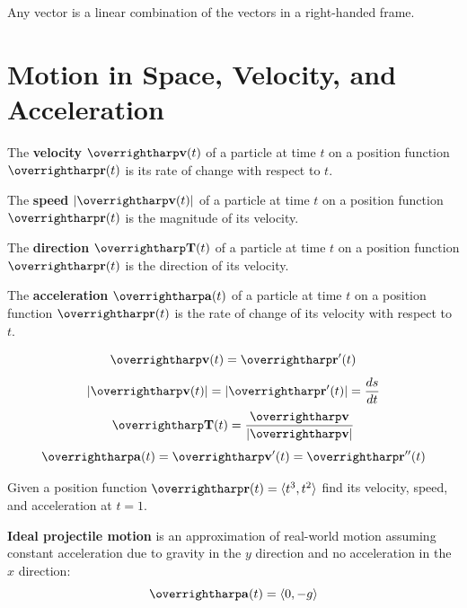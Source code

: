\documentclass[letterpaper, twoside, 12pt]{book}
\begin{document}
\begin{theorem}
  Any vector is a linear combination of the vectors in a right-handed frame.
\end{theorem}


\section{Motion in Space, Velocity, and Acceleration}

\begin{definition}
The \textbf{velocity} $\vect{v}(t)$ of a particle at time $t$ on a position
function $\vect{r}(t)$ is its rate of change with respect to $t$.
\end{definition}

\begin{definition}
The \textbf{speed} $|\vect{v}(t)|$ of a particle at time $t$ on a position
function $\vect{r}(t)$ is the magnitude of its velocity.
\end{definition}

\begin{definition}
The \textbf{direction} $\vect{T}(t)$ of a particle at time $t$ on a position
function $\vect{r}(t)$ is the direction of its velocity.
\end{definition}

\begin{definition}
The \textbf{acceleration} $\vect{a}(t)$ of a particle at time $t$ on a position
function $\vect{r}(t)$ is the rate of change of its velocity with respect to $t$.
\end{definition}

\begin{theorem}
\[
  \vect{v}(t)=\vect{r}'(t)
\]
\[
  |\vect{v}(t)|=|\vect{r}'(t)|=\frac{ds}{dt}
\]
\[
  \vect{T}(t) = \frac{\vect v}{|\vect v|}
\]
\[
  \vect{a}(t)=\vect{v}'(t)=\vect{r}''(t)
\]
\end{theorem}

\begin{problem}
  Given a position function $\harpvec{r}(t) = \<t^3,t^2\>$ find its velocity,
  speed, and acceleration at $t = 1$.
\end{problem}

\begin{definition}
  \textbf{Ideal projectile motion} is an approximation of real-world
  motion assuming constant acceleration due to gravity in the $y$ direction
  and no acceleration in the $x$ direction:
    \[
      \vect{a}(t) = \<0,-g\>
    \]
\end{definition}
\end{document}
